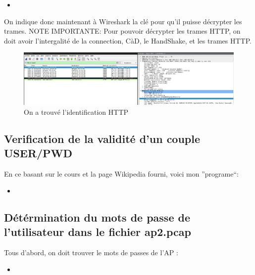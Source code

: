 \documentclass[10pt,a4paper]{article}
\newcommand{\insertcode}[2]{\begin{itemize}\item[]\end{itemize}}
\begin{document}
\insertcode{code/manipBuddy}{On à reussi}
On indique donc maintenant à Wireshark la clé pour qu'il puisse décrypter les trames.
NOTE IMPORTANTE: Pour pouvoir décrypter les trames HTTP, on doit avoir l'intergalité de la connection, CàD, le HandShake, et les trames HTTP.
\begin{figure}[h!]
\centering
\includegraphics[scale=0.250]{image/6.jpg}
\caption{On a trouvé l'identification HTTP}
\label{fig:net }
\end{figure}
\newpage
\subsection{Verification de la validité d'un couple USER/PWD}
En ce basant sur le cours et la page Wikipedia fourni, voici mon ''programe``:
\insertcode{code/AuthDigest/digest_auth.sh}{Digest Auth }
\subsection{Détérmination du mots de passe de l'utilisateur dans le fichier ap2.pcap}
Tous d'abord, on doit trouver le mots de passes de l'AP :
\insertcode{code/manipAP2I}{71862093}
\end{document}

